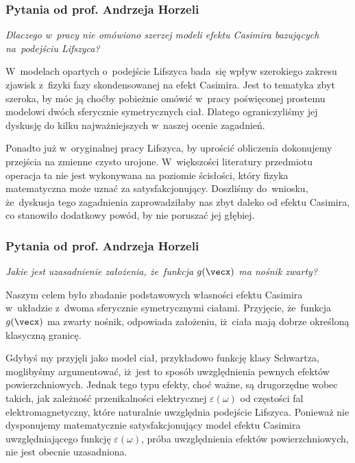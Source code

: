 \documentclass[10pt,t]{beamer}
\begin{document}
\begin{frame}
  \frametitle{Pytania od prof. Andrzeja Horzeli}


  \textit{Dlaczego w~pracy nie omówiono szerzej modeli efektu
    Casimira bazujących na~podejściu Lifszyca?}

  W~modelach opartych o~podejście Lifszyca bada~się wpływ szerokiego
  zakresu zjawisk z~fizyki fazy skondensowanej na efekt Casimira.
  Jest to tematyka zbyt szeroka, by móc ją choćby pobieżnie omówić w~pracy
  poświęconej prostemu modelowi dwóch sferycznie symetrycznych ciał.
  Dlatego ograniczyliśmy jej dyskusję do kilku najważniejszych
  w~naszej ocenie zagadnień.

  Ponadto już w~oryginalnej pracy Lifszyca, by uprościć obliczenia
  dokonujemy przejścia na zmienne czysto urojone. W~większości literatury
  przedmiotu operacja ta nie jest wykonywana na poziomie ścisłości,
  który fizyka matematyczna może uznać za satysfakcjonujący. Doszliśmy
  do~wniosku, że~dyskusja tego zagadnienia zaprowadziłaby nas zbyt daleko
  od efektu Casimira, co stanowiło dodatkowy powód, by nie poruszać jej
  głębiej.

\end{frame}





\begin{frame}
  \frametitle{Pytania od prof. Andrzeja Horzeli}


  \textit{Jakie jest uzasadnienie założenia, że~funkcja $g( \vecx )$ ma
    nośnik zwarty?}

  Naszym celem było zbadanie podstawowych własności efektu Casimira
  w~układzie z~dwoma sferycznie symetrycznymi ciałami. Przyjęcie,
  że~funkcja $g( \vecx )$ ma zwarty nośnik, odpowiada założeniu,
  iż~ciała mają dobrze określoną klasyczną granicę.

  Gdybyś my przyjęli jako model ciał, przykładowo funkcję klasy Schwartza,
  moglibyśmy argumentować, iż~jest to sposób uwzględnienia pewnych efektów
  powierzchniowych. Jednak tego typu efekty, choć ważne, są drugorzędne
  wobec takich, jak zależność przenikalności elektrycznej
  $\varepsilon( \omega )$ od częstości fal elektromagnetyczny, które naturalnie uwzględnia
  podejście Lifszyca. Ponieważ nie dysponujemy matematycznie
  satysfakcjonujący model efektu Casimira uwzględniającego funkcję
  $\varepsilon( \omega )$, próba uwzględnienia efektów powierzchniowych, nie jest obecnie
  uzasadniona.

\end{frame}
\end{document}

